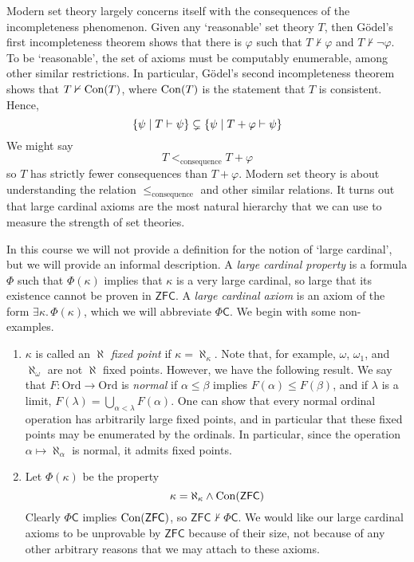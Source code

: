 Modern set theory largely concerns itself with the consequences of the incompleteness phenomenon.
Given any `reasonable' set theory \( T \), then G\"odel's first incompleteness theorem shows that there is \( \varphi \) such that \( T \nvdash \varphi \) and \( T \nvdash \neg\varphi \).
To be `reasonable', the set of axioms must be computably enumerable, among other similar restrictions.
In particular, G\"odel's second incompleteness theorem shows that \( T \nvdash \operatorname{Con}(T) \), where \( \operatorname{Con}(T) \) is the statement that \( T \) is consistent.
Hence,
\[ \qty{\psi \mid T \vdash \psi} \subsetneq \qty{\psi \mid T + \varphi \vdash \psi} \]
We might say
\[ T <_{\text{consequence}} T + \varphi \]
so \( T \) has strictly fewer consequences than \( T + \varphi \).
Modern set theory is about understanding the relation \( \leq_{\text{consequence}} \) and other similar relations.
It turns out that large cardinal axioms are the most natural hierarchy that we can use to measure the strength of set theories.

In this course we will not provide a definition for the notion of `large cardinal', but we will provide an informal description.
A \emph{large cardinal property} is a formula \( \Phi \) such that \( \Phi(\kappa) \) implies that \( \kappa \) is a very large cardinal, so large that its existence cannot be proven in \( \mathsf{ZFC} \).
A \emph{large cardinal axiom} is an axiom of the form \( \exists \kappa.\, \Phi(\kappa) \), which we will abbreviate \( \Phi \mathsf{C} \).
We begin with some non-examples.

\begin{enumerate}
    \item \( \kappa \) is called an \emph{\( \aleph \) fixed point} if \( \kappa = \aleph_\kappa \).
    Note that, for example, \( \omega \), \( \omega_1 \), and \( \aleph_\omega \) are not \( \aleph \) fixed points.
    However, we have the following result.
    We say that \( F : \mathrm{Ord} \to \mathrm{Ord} \) is \emph{normal} if \( \alpha \leq \beta \) implies \( F(\alpha) \leq F(\beta) \), and if \( \lambda \) is a limit, \( F(\lambda) = \bigcup_{\alpha < \lambda} F(\alpha) \).
    One can show that every normal ordinal operation has arbitrarily large fixed points, and in particular that these fixed points may be enumerated by the ordinals.
    In particular, since the operation \( \alpha \mapsto \aleph_\alpha \) is normal, it admits fixed points.
    \item Let \( \Phi(\kappa) \) be the property
    \[ \kappa = \aleph_\kappa \wedge \operatorname{Con}(\mathsf{ZFC}) \]
    Clearly \( \Phi \mathsf{C} \) implies \( \operatorname{Con}(\mathsf{ZFC}) \), so \( \mathsf{ZFC} \nvdash \Phi \mathsf{C} \).
    We would like our large cardinal axioms to be unprovable by \( \mathsf{ZFC} \) because of their size, not because of any other arbitrary reasons that we may attach to these axioms.
\end{enumerate}

